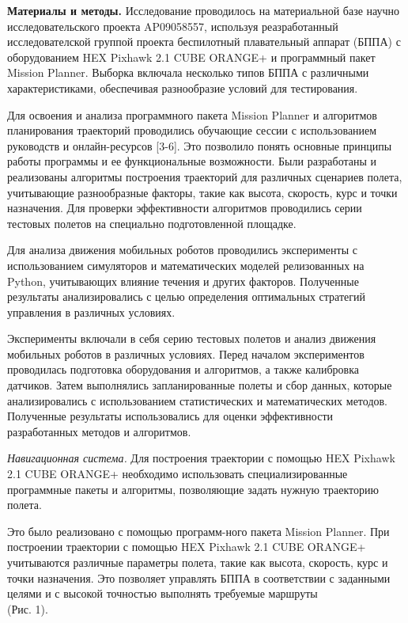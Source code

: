\begin{multicols}{2}
{\bfseries Материалы и методы.} Исследование проводилось на материальной
базе научно исследовательского проекта AP09058557, используя
реазработанный исследователской группой проекта беспилотный плавательный
аппарат (БППА) с оборудованием HEX Pixhawk 2.1 CUBE ORANGE+ и
программный пакет Mission Planner. Выборка включала несколько типов БППА
с различными характеристиками, обеспечивая разнообразие условий для
тестирования.

Для освоения и анализа программного пакета Mission Planner и алгоритмов
планирования траекторий проводились обучающие сессии с использованием
руководств и онлайн-ресурсов {[}3-6{]}. Это позволило понять основные
принципы работы программы и ее функциональные возможности. Были
разработаны и реализованы алгоритмы построения траекторий для различных
сценариев полета, учитывающие разнообразные факторы, такие как высота,
скорость, курс и точки назначения. Для проверки эффективности алгоритмов
проводились серии тестовых полетов на специально подготовленной
площадке.

Для анализа движения мобильных роботов проводились эксперименты с
использованием симуляторов и математических моделей релизованных на
Python, учитывающих влияние течения и других факторов. Полученные
результаты анализировались с целью определения оптимальных стратегий
управления в различных условиях.

Эксперименты включали в себя серию тестовых полетов и анализ движения
мобильных роботов в различных условиях. Перед началом экспериментов
проводилась подготовка оборудования и алгоритмов, а также калибровка
датчиков. Затем выполнялись запланированные полеты и сбор данных,
которые анализировались с использованием статистических и математических
методов. Полученные результаты использовались для оценки эффективности
разработанных методов и алгоритмов.

\emph{Навигационная система.} Для построения траектории с помощью HEX
Pixhawk 2.1 CUBE ORANGE+ необходимо использовать специализированные
программные пакеты и алгоритмы, позволяющие задать нужную траекторию
полета.

Это было реализовано с помощью программ-ного пакета Mission Planner. При
построении траектории с помощью HEX Pixhawk 2.1 CUBE ORANGE+ учитываются
различные параметры полета, такие как высота, скорость, курс и точки
назначения. Это позволяет управлять БППА в соответствии с заданными
целями и с высокой точностью выполнять требуемые маршруты \\(Рис. 1).
\end{multicols}

